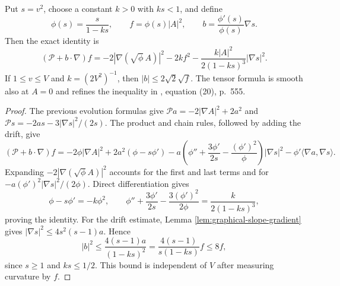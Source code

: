 \begin{proposition}\label{prop:graphical-rational-curvature-identity}
Put $s=v^2$, choose a constant $k>0$ with $ks<1$, and define
\[
 \phi(s)=\frac{s}{1-ks},\qquad f=\phi(s)|A|^2,
 \qquad b=\frac{\phi'(s)}{\phi(s)}\nabla s.
\]
Then the exact identity is
\[
 (\mathcal P+b\cdot\nabla)f
 =-2|\nabla(\sqrt{\phi}\,A)|^2-2kf^2
       -\frac{k|A|^2}{2(1-ks)^3}|\nabla s|^2.
\]
If $1\leq v\leq V$ and $k=(2V^2)^{-1}$, then $|b|\leq2\sqrt2\sqrt f$. The tensor formula is smooth also at $A=0$ and refines the inequality in \cite{EH91}, equation (20), p.~555.
\end{proposition}
\begin{proof}
The previous evolution formulas give
$\mathcal Pa=-2|\nabla A|^2+2a^2$ and
$\mathcal Ps=-2as-3|\nabla s|^2/(2s)$.
The product and chain rules, followed by adding the drift, give
\[
 (\mathcal P+b\cdot\nabla)f
 =-2\phi|\nabla A|^2+2a^2(\phi-s\phi')
 -a\left(\phi''+\frac{3\phi'}{2s}-\frac{(\phi')^2}{\phi}\right)|\nabla s|^2
 -\phi'\langle\nabla a,\nabla s\rangle.
\]
Expanding $-2|\nabla(\sqrt\phi A)|^2$ accounts for the first and last terms and for $-a(\phi')^2|\nabla s|^2/(2\phi)$. Direct differentiation gives
\[
 \phi-s\phi'=-k\phi^2,\qquad
 \phi''+\frac{3\phi'}{2s}-\frac{3(\phi')^2}{2\phi}
       =\frac{k}{2(1-ks)^3},
\]
proving the identity. For the drift estimate, Lemma \ref{lem:graphical-slope-gradient} gives $|\nabla s|^2\leq4s^2(s-1)a$. Hence
\[
 |b|^2\leq\frac{4(s-1)a}{(1-ks)^2}
       =\frac{4(s-1)}{s(1-ks)}f\leq8f,
\]
since $s\geq1$ and $ks\leq1/2$. This bound is independent of $V$ after measuring curvature by $f$.
\end{proof}

